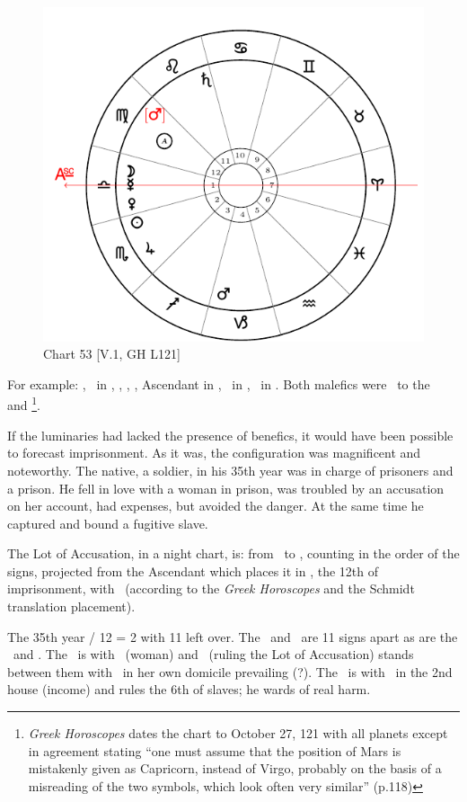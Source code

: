 \newpage

\begin{figure}
\centering
\includegraphics[width=.68\textwidth]{charts/5_01_1}
\caption{Chart 53 [V.1, GH L121]}
\label{fig:chart53}
\end{figure}

For example: \Sun, \Jupiter\, in \Scorpio, \Moon, \Mercury, \Venus, Ascendant in \Libra, \Saturn\, in \Leo,
\Mars\, in \Capricorn. Both malefics were \Sextile\, to the \Sun\, and \Moon\footnote{\textit{Greek Horoscopes} dates the chart to October 27, 121 with all planets except \Mars\, in agreement stating ``one must assume that the position of Mars is mistakenly given as Capricorn, instead of Virgo, probably on the basis of a misreading of the two symbols, which look often very similar'' (p.118)}. 

If the luminaries had lacked the presence of benefics, it would have been possible to forecast imprisonment. As it was, the configuration was magnificent and noteworthy. The native, a soldier, in his 35th year was in charge of prisoners and a prison. He fell in love with a woman in prison, was troubled by an accusation on her account, had expenses, but avoided the danger. At the same time he captured and bound a fugitive slave.

\begin{mdframed}[backgroundcolor=cyan!5]
\scriptsize
The Lot of Accusation, in a night chart, is: from \Mars\, to \Saturn, counting in the order of the signs, projected from the Ascendant which places it in \Virgo, the 12th of imprisonment, with \Mars\, (according to the \textsl{Greek Horoscopes} and the Schmidt translation placement).

The 35th year / 12 = 2 with 11 left over.  The \Sun\, and \Mars\, are 11 signs apart as are the \Moon\, and \Saturn.  The \Moon\, is with \Venus\, (woman) and \Mercury\, (ruling the Lot of Accusation) stands between them with \Venus\, in her own domicile prevailing (?). The \Sun\, is with \Jupiter\, in the 2nd house (income) and rules the 6th of slaves; he wards of real harm.
\end{mdframed}

\newpage

